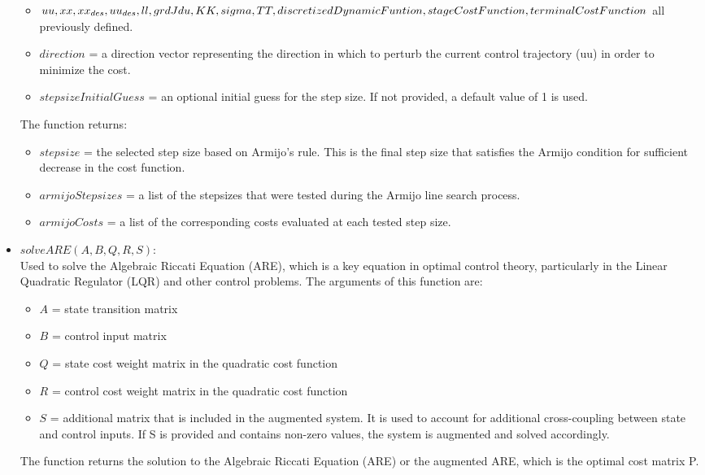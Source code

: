 \documentclass[a4paper,11pt,oneside]{book}
\begin{document}
\begin{itemize}
    \begin{itemize}
        \item $uu, xx, xx_{des}, uu_{des}, ll, grdJdu, KK, sigma, TT,\\ discretizedDynamicFuntion, stageCostFunction, terminalCostFunction$ all previously defined.
        \item $direction$ = a direction vector representing the direction in which to perturb the current control trajectory (uu) in order to minimize the cost.
        \item $stepsizeInitialGuess$ = an optional initial guess for the step size. If not provided, a default value of 1 is used.
    \end{itemize}
    The function returns:
    \begin{itemize}
        \item $stepsize$ = the selected step size based on Armijo's rule. This is the final step size that satisfies the Armijo condition for sufficient decrease in the cost function.
        \item $armijoStepsizes$ = a list of the stepsizes that were tested during the Armijo line search process.
        \item $armijoCosts$ = a list of the corresponding costs evaluated at each tested step size.
    \end{itemize}
    \item $solveARE(A, B, Q, R, S)$:\\
    Used to solve the Algebraic Riccati Equation (ARE), which is a key equation in optimal control theory, particularly in the Linear Quadratic Regulator (LQR) and other control problems. The arguments of this function are:
    \begin{itemize}
        \item $A$ = state transition matrix 
        \item $B$ = control input matrix
        \item $Q$ = state cost weight matrix in the quadratic cost function
        \item $R$ = control cost weight matrix in the quadratic cost function
        \item $S$ = additional matrix that is included in the augmented system. It is used to account for additional cross-coupling between state and control inputs. If S is provided and contains non-zero values, the system is augmented and solved accordingly.
    \end{itemize}
    The function returns the solution to the Algebraic Riccati Equation (ARE) or the augmented ARE, which is the optimal cost matrix P.

\end{itemize}
\end{document}
